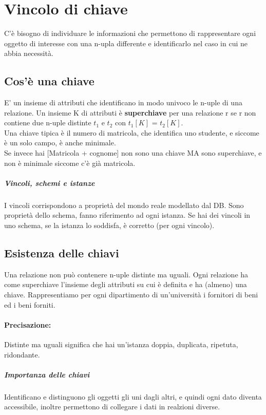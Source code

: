 \documentclass[12pt, a4paper, openany, twoside]{book}
\begin{document}
\section{Vincolo di chiave}
C'è bisogno di individuare le informazioni che permettono di rappresentare ogni
oggetto di interesse con una n-upla differente e identificarlo nel caso in
cui ne abbia necessità.
\subsection{Cos'è una chiave} E' un insieme di attributi che identificano in modo
univoco le n-uple di una relazione. 
Un insieme K di attributi è \textbf{superchiave} per una relazione r se r non 
contiene due n-uple distinte $t_{1}$ e $t_{2}$ con $t_{1}[K]$ = $t_{2}[K]$.
\\ Una chiave tipica è il numero di matricola, che identifica uno studente, e
siccome è un solo campo, è anche minimale. \\
Se invece hai [Matricola + cognome] non sono una chiave MA sono superchiave, 
e non è minimale siccome c'è già matricola.
\subparagraph{Vincoli, schemi e istanze}
I vincoli corrispondono a proprietà del mondo reale modellato dal DB. Sono
proprietà dello schema, fanno riferimento ad ogni istanza. Se hai dei vincoli
in uno schema, se la istanza lo soddisfa, è corretto (per ogni vincolo).	
\subsection{Esistenza delle chiavi}	
Una relazione non può contenere n-uple distinte ma uguali. Ogni relazione ha come
superchiave l'insieme degli attributi su cui è definita e ha (almeno) una chiave.
Rappresentiamo per ogni dipartimento di un'università i fornitori di beni ed i 
beni forniti.
\paragraph{Precisazione:} Distinte ma uguali significa che hai un'istanza doppia,
duplicata, ripetuta, ridondante. 
\subparagraph{Importanza delle chiavi}
Identificano e distinguono gli oggetti gli uni dagli altri, e quindi ogni dato
diventa accessibile, inoltre permettono di collegare i dati in realzioni diverse.
\end{document}
